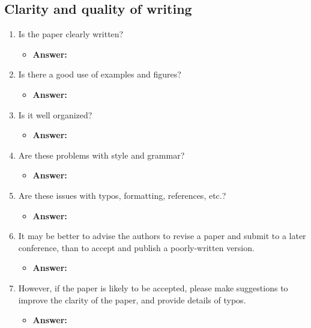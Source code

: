 \documentclass[a4paper]{article}
\begin{document}
\subsection{Clarity and quality of writing}

\begin{enumerate}[label=(\alph*)]
	\item Is the paper clearly written?
		\begin{itemize}
			\item \textbf{Answer:}	
		\end{itemize}			
	
	
	\item Is there a good use of examples and figures?
		\begin{itemize}
			\item \textbf{Answer:}	
		\end{itemize}			
	
	\item Is it well organized?
		\begin{itemize}
			\item \textbf{Answer:}	
		\end{itemize}			
	
	
	\item Are these problems with style and grammar?
		\begin{itemize}
			\item \textbf{Answer:}	
		\end{itemize}			
	
	
	\item Are these issues with typos, formatting, references, etc.?
		\begin{itemize}
			\item \textbf{Answer:}	
		\end{itemize}			
	
	
	
	\item It may be better to advise the authors to revise a paper and submit to a later conference, than to accept and publish a poorly-written version.
		\begin{itemize}
			\item \textbf{Answer:}	
		\end{itemize}			
	
	
	
	\item However, if the paper is likely to be accepted, please make suggestions to improve the clarity of the paper, and provide details of typos.
		\begin{itemize}
			\item \textbf{Answer:}	
		\end{itemize}			
	
	
	
\end{enumerate}
\end{document}
